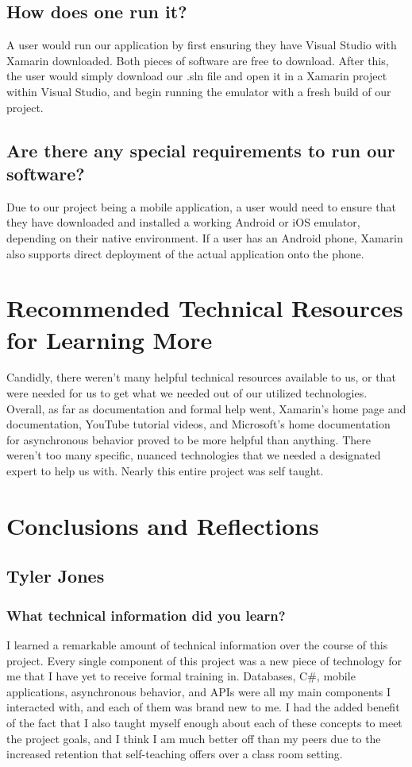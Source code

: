 \documentclass[onecolumn, draftclsnofoot,10pt, compsoc]{IEEEtran}
\begin{document}
\subsection{How does one run it?}
A user would run our application by first ensuring they have Visual Studio with Xamarin downloaded. Both pieces of software are free to download. After this, the user would simply download our .sln file and open it in a Xamarin project within Visual Studio, and begin running the emulator with a fresh build of our project.
\subsection{Are there any special requirements to run our software?}
Due to our project being a mobile application, a user would need to ensure that they have downloaded and installed a working Android or iOS emulator, depending on their native environment. If a user has an Android phone, Xamarin also supports direct deployment of the actual application onto the phone.

\newpage

\section{Recommended Technical Resources for Learning More}
Candidly, there weren't many helpful technical resources available to us, or that were needed for us to get what we needed out of our utilized technologies. Overall, as far as documentation and formal help went, Xamarin's home page and documentation, YouTube tutorial videos, and Microsoft's home documentation for asynchronous behavior proved to be more helpful than anything. There weren't too many specific, nuanced technologies that we needed a designated expert to help us with. Nearly this entire project was self taught.
\section{Conclusions and Reflections}
\subsection{Tyler Jones}
\subsubsection{What technical information did you learn?}
I learned a remarkable amount of technical information over the course of this project. Every single component of this project was a new piece of technology for me that I have yet to receive formal training in. Databases, C\#, mobile applications, asynchronous behavior, and APIs were all my main components I interacted with, and each of them was brand new to me. I had the added benefit of the fact that I also taught myself enough about each of these concepts to meet the project goals, and I think I am much better off than my peers due to the increased retention that self-teaching offers over a class room setting.
\end{document}
